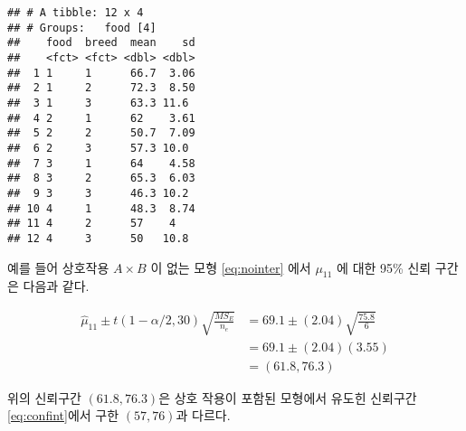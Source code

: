 \documentclass[
]{book}
\begin{document}
\begin{verbatim}
## # A tibble: 12 x 4
## # Groups:   food [4]
##    food  breed  mean    sd
##    <fct> <fct> <dbl> <dbl>
##  1 1     1      66.7  3.06
##  2 1     2      72.3  8.50
##  3 1     3      63.3 11.6 
##  4 2     1      62    3.61
##  5 2     2      50.7  7.09
##  6 2     3      57.3 10.0 
##  7 3     1      64    4.58
##  8 3     2      65.3  6.03
##  9 3     3      46.3 10.2 
## 10 4     1      48.3  8.74
## 11 4     2      57    4   
## 12 4     3      50   10.8
\end{verbatim}

예를 들어 상호작용 \(A \times B\) 이 없는 모형 \eqref{eq:nointer} 에서 \(\mu_{11}\) 에 대한 95\% 신뢰 구간은 다음과 같다.

\begin{align*}
\hat \mu_{11}  \pm t(1-\alpha/2, 30) \sqrt{ \frac{MS_E}{n_e}} 
& = 69.1 \pm (2.04)\sqrt{\frac{ 75.8}{6}} \\
& = 69.1 \pm (2.04)(3.55) \\
& = (61.8, 76.3) 
\end{align*}

위의 신뢰구간 \((61.8, 76.3)\)은 상호 작용이 포함된 모형에서 유도힌 신뢰구간 \eqref{eq:confint}에서 구한 \((57, 76)\)과 다르다.

  
\end{document}
